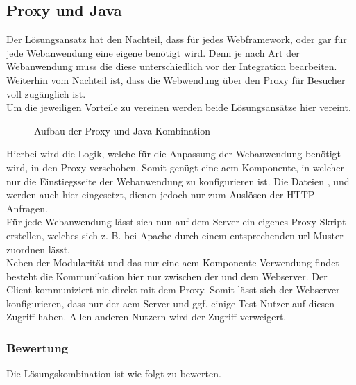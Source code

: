 \subsection{Proxy und Java}

Der Lösungsansatz  hat den Nachteil, dass für jedes Webframework, oder gar für jede Webanwendung eine eigene \ajc benötigt wird. Denn je nach Art der Webanwendung muss die \ajc diese unterschiedlich vor der Integration bearbeiten.  \\
Weiterhin vom Nachteil ist, dass die Webwendung über den Proxy für Besucher voll zugänglich ist. \\
Um die jeweiligen Vorteile zu vereinen werden beide Lösungsansätze hier vereint. 
\begin{figure}[H]
	\begin{center}
		
		\caption{Aufbau der Proxy und Java Kombination}
		\label{img:proxyjava}
	\end{center}
\end{figure}

Hierbei wird die Logik, welche für die Anpassung der Webanwendung benötigt wird, in den Proxy verschoben. Somit genügt eine \ac{aem}-Komponente, in welcher nur die Einstiegsseite der Webanwendung zu konfigurieren ist. Die Dateien ,  und  werden auch hier eingesetzt, dienen jedoch nur zum Auslösen der HTTP-Anfragen.\\
Für jede Webanwendung lässt sich nun auf dem Server ein eigenes Proxy-Skript erstellen, welches sich z. B. bei Apache durch  einem entsprechenden \ac{url}-Muster zuordnen lässt. \\
Neben der Modularität und das nur eine \ac{aem}-Komponente Verwendung findet besteht die Kommunikation hier nur zwischen der \ajc und dem Webserver. Der Client kommuniziert nie direkt mit dem Proxy. Somit lässt sich der Webserver konfigurieren, dass nur der \ac{aem}-Server und ggf. einige Test-Nutzer auf diesen Zugriff haben. Allen anderen Nutzern wird der Zugriff verweigert.

\subsubsection{Bewertung}

Die Lösungskombination ist wie folgt zu bewerten.

